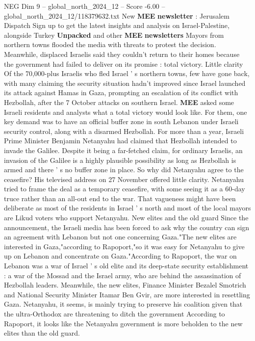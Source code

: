 \begin{textsample}{NEG Dim 9 – global\_north\_2024\_12 – Score -6.00 – global\_north\_2024\_12/118379632.txt}  \label{ex:f9_neg_124}
New \textbf{MEE} \textbf{newsletter} : Jerusalem Dispatch Sign up to get the latest insights and analysis on Israel-Palestine, alongside Turkey \textbf{Unpacked} and other \textbf{MEE} \textbf{newsletters} Mayors from northern towns flooded the media with threats to protest the decision.
Meanwhile, displaced Israelis said they couldn't return to their homes because the government had failed to deliver on its promise : total victory.
Little clarity Of the 70,000-plus Israelis who fled Israel ' s northern towns, few have gone back, with many claiming the security situation hadn't improved since Israel launched its attack against Hamas in Gaza, prompting an escalation of its conflict with Hezbollah, after the 7 October attacks on southern Israel. \textbf{MEE} asked some Israeli residents and analysts what a total victory would look like.
For them, one key demand was to have an official buffer zone in south Lebanon under Israeli security control, along with a disarmed Hezbollah.
For more than a year, Israeli Prime Minister Benjamin Netanyahu had claimed that Hezbollah intended to invade the Galilee.
Despite it being a far-fetched claim, for ordinary Israelis, an invasion of the Galilee is a highly plausible possibility as long as Hezbollah is armed and there ' s no buffer zone in place.
So why did Netanyahu agree to the ceasefire?
His televised address on 27 November offered little clarity.
Netanyahu tried to frame the deal as a temporary ceasefire, with some seeing it as a 60-day truce rather than an all-out end to the war.
That vagueness might have been deliberate as most of the residents in Israel ' s north and most of the local mayors are Likud voters who support Netanyahu.
New elites and the old guard Since the announcement, the Israeli media has been forced to ask why the country can sign an agreement with Lebanon but not one concerning Gaza."The new elites are interested in Gaza,"according to Rapoport,"so it was easy for Netanyahu to give up on Lebanon and concentrate on Gaza."According to Rapoport, the war on Lebanon was a war of Israel ' s old elite and its deep-state security establishment : a war of the Mossad and the Israel army, who are behind the assassination of Hezbollah leaders.
Meanwhile, the new elites, Finance Minister Bezalel Smotrich and National Security Minister Itamar Ben Gvir, are more interested in resettling Gaza.
Netanyahu, it seems, is mainly trying to preserve his coalition given that the ultra-Orthodox are threatening to ditch the government According to Rapoport, it looks like the Netanyahu government is more beholden to the new elites than the old guard.

\end{textsample}
